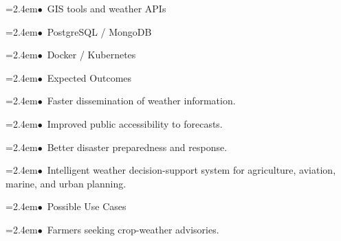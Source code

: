 \documentclass[10pt,a4paper]{article}
\begin{document}
\begin{tcolorbox}[pscard, title={"\textbf{SIH26068} \quad $\vert$ \quad WeatherGPT: Conversational AI for Weather Forecasting, Alerts, and Climate ...}]
\noindent\hspace*{1.2em}\hangindent=2.4em\textcolor{sihblue}{$\bullet$}~\small GIS tools and weather APIs\par\vspace{0.05cm}
\noindent\hspace*{1.2em}\hangindent=2.4em\textcolor{sihblue}{$\bullet$}~\small PostgreSQL / MongoDB\par\vspace{0.05cm}
\noindent\hspace*{1.2em}\hangindent=2.4em\textcolor{sihblue}{$\bullet$}~\small Docker / Kubernetes\par\vspace{0.05cm}
\noindent\hspace*{1.2em}\hangindent=2.4em\textcolor{sihblue}{$\bullet$}~\small Expected Outcomes\par\vspace{0.05cm}
\noindent\hspace*{1.2em}\hangindent=2.4em\textcolor{sihblue}{$\bullet$}~\small Faster dissemination of weather information.\par\vspace{0.05cm}
\noindent\hspace*{1.2em}\hangindent=2.4em\textcolor{sihblue}{$\bullet$}~\small Improved public accessibility to forecasts.\par\vspace{0.05cm}
\noindent\hspace*{1.2em}\hangindent=2.4em\textcolor{sihblue}{$\bullet$}~\small Better disaster preparedness and response.\par\vspace{0.05cm}
\noindent\hspace*{1.2em}\hangindent=2.4em\textcolor{sihblue}{$\bullet$}~\small Intelligent weather decision-support system for agriculture, aviation, marine, and urban planning.\par\vspace{0.05cm}
\noindent\hspace*{1.2em}\hangindent=2.4em\textcolor{sihblue}{$\bullet$}~\small Possible Use Cases\par\vspace{0.05cm}
\noindent\hspace*{1.2em}\hangindent=2.4em\textcolor{sihblue}{$\bullet$}~\small Farmers seeking crop-weather advisories.\par\vspace{0.05cm}

\end{tcolorbox}
\end{document}
